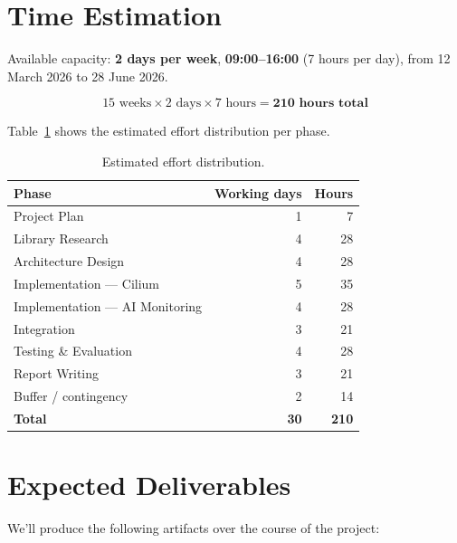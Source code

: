 \section{Time Estimation}

Available capacity: \textbf{2 days per week}, \textbf{09:00--16:00} (7 hours per day), from 12 March 2026 to 28 June 2026.

\[
  15 \text{ weeks} \times 2 \text{ days} \times 7 \text{ hours} = \textbf{210 hours total}
\]

Table~\ref{tab:hours} shows the estimated effort distribution per phase.

\begin{table}[H]
\centering
\caption{Estimated effort distribution.}
\label{tab:hours}
\begin{tabular}{@{}lrr@{}}
\toprule
\textbf{Phase} & \textbf{Working days} & \textbf{Hours} \\
\midrule
Project Plan              & 1  & 7  \\
Library Research          & 4  & 28 \\
Architecture Design       & 4  & 28 \\
Implementation --- Cilium & 5  & 35 \\
Implementation --- AI Monitoring & 4 & 28 \\
Integration               & 3  & 21 \\
Testing \& Evaluation     & 4  & 28 \\
Report Writing            & 3  & 21 \\
Buffer / contingency      & 2  & 14 \\
\midrule
\textbf{Total}            & \textbf{30} & \textbf{210} \\
\bottomrule
\end{tabular}
\end{table}

\section{Expected Deliverables}

We'll produce the following artifacts over the course of the project:

